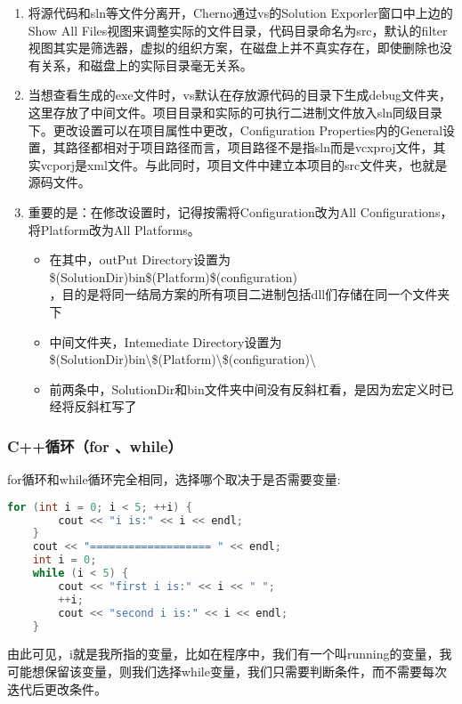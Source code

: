 \begin{enumerate}
	\item 将源代码和sln等文件分离开，Cherno通过vs的Solution Exporler窗口中上边的Show All Files视图来调整实际的文件目录，代码目录命名为{\ncodestyle src}，默认的filter视图其实是筛选器，虚拟的组织方案，在磁盘上并不真实存在，即使删除也没有关系，和磁盘上的实际目录毫无关系。
	\item 当想查看生成的exe文件时，vs默认在存放源代码的目录下生成debug文件夹，这里存放了中间文件。项目目录和实际的可执行二进制文件放入sln同级目录下。更改设置可以在项目属性中更改，Configuration Properties内的{\ncodestyle General}设置，其路径都相对于项目路径而言，项目路径不是指{\ncodestyle sln}而是{\ncodestyle vcxproj}文件，其实{\ncodestyle vcporj}是xml文件。与此同时，项目文件中建立本项目的{\ncodestyle src}文件夹，也就是源码文件。
	\item 重要的是：在修改设置时，记得按需将Configuration改为All Configurations，将Platform改为All Platforms。
	\begin{itemize}
		\item 在其中，outPut Directory设置为\$(SolutionDir)bin\$(Platform)\$(configuration)\\，目的是将同一结局方案的所有项目二进制包括dll们存储在同一个文件夹下
		\item 中间文件夹，Intemediate Directory设置为\$(SolutionDir)bin\textbackslash\$(Platform)\textbackslash\$(configuration)\textbackslash
		\item 前两条中，{\ncodestyle SolutionDir}和{\ncodestyle bin}文件夹中间没有反斜杠看，是因为宏定义时已经将反斜杠写了
	\end{itemize}
\end{enumerate}


\subsubsection{C++循环（for 、while）}
for循环和while循环完全相同，选择哪个取决于是否需要变量:
\begin{lstlisting}[language=C++]
    for (int i = 0; i < 5; ++i) {
        cout << "i is:" << i << endl;
    }
    cout << "=================== " << endl;
    int i = 0;
    while (i < 5) {
        cout << "first i is:" << i << " ";
        ++i;
        cout << "second i is:" << i << endl;
    }
\end{lstlisting}

由此可见，{\ncodestyle i}就是我所指的变量，比如在程序中，我们有一个叫{\ncodestyle running}的变量，我可能想保留该变量，则我们选择{\ncodestyle while}变量，我们只需要判断条件，而不需要每次迭代后更改条件。

